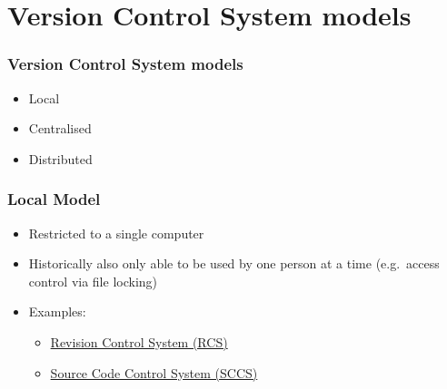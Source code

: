 \section{Version Control System models}

\begin{frame}
    \frametitle{Version Control System models}
    \begin{itemize}
        \item Local
        \item Centralised
        \item Distributed
    \end{itemize}
\end{frame}

\begin{frame}
\frametitle{Local Model}
\begin{itemize}
    \item Restricted to a single computer
    \item Historically also only able to be used by one person at a time
        (e.g.\ access control via file locking)
    \item Examples:
        \begin{itemize}
            \item \href{https://en.wikipedia.org/wiki/Revision_Control_System}
                       {Revision Control System (RCS)}
            \item \href{https://en.wikipedia.org/wiki/Source_Code_Control_System}
                       {Source Code Control System (SCCS)}
        \end{itemize}
\end{itemize}
\end{frame}

